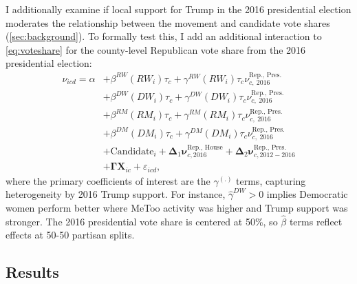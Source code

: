 \documentclass[manuscript,screen,nonacm,11pt,acm]{acmart}
\begin{document}
I additionally examine if local support for Trump in the 2016 presidential election moderates the relationship between the movement and candidate vote shares (\cref{sec:background}).
To formally test this, I add an additional interaction to \cref{eq:voteshare} for the county-level Republican vote share from the 2016 presidential election:
\begin{equation}
\begin{split}
\label{eq:repPres}
\nu_{icd} = \alpha &+ \beta^{RW} (RW_i) \tau_c + \gamma^{RW}(RW_i)\tau_c \nu^{\text{Rep., Pres.}}_{c,\ 2016}\\
&+ \beta^{DW} (DW_i) \tau_c + \gamma^{DW}(DW_i)\tau_c \nu^{\text{Rep., Pres.}}_{c,\ 2016}\\
&+ \beta^{RM} (RM_i) \tau_c + \gamma^{RM}(RM_i)\tau_c \nu^{\text{Rep., Pres.}}_{c,\ 2016}\\
&+ \beta^{DM} (DM_i) \tau_c + \gamma^{DM}(DM_i)\tau_c \nu^{\text{Rep., Pres.}}_{c,\ 2016}\\
&+ \text{Candidate}_i + \bm{\Delta}_1 \bm{\nu}^{\text{Rep., House}}_{c, 2016} + \bm{\Delta}_2 \bm{\nu}^{\text{Rep., Pres.}}_{c, 2012-2016}\\
&+ \bm{\Gamma} \bm{X}_{ic} + \varepsilon_{icd},
\end{split}
\end{equation}
where the primary coefficients of interest are the $\gamma^{(.)}$ terms, capturing heterogeneity by 2016 Trump support.
For instance, $\hat{\gamma}^{DW}>0$ implies Democratic women perform better where MeToo activity was higher and Trump support was stronger.
The 2016 presidential vote share is centered at 50\%, so $\hat{\beta}$ terms reflect effects at 50-50 partisan splits.

\subsection{Results}
\label{sec:voteshare-results}
\end{document}
